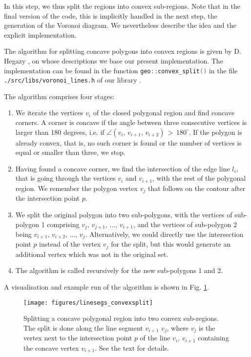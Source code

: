 In this step, we thus split the regions into convex sub-regions. 
Note that in the final version of the code, this is implicitly handled in the next step, the generation of 
the Voronoi diagram. We nevertheless describe the idea and the explicit implementation.

The algorithm for splitting concave polygons into convex regions is given by D. Hegazy \cite{Hegazy2014},
on whose descriptions we base our present implementation.
The implementation can be found in the function \lstinline[language=C++]|geo::convex_split()| in the file
\lstinline|./src/libs/voronoi_lines.h| of our library .

The algorithm \cite{Hegazy2014} comprises four stages: 
\begin{enumerate}
	\item We iterate the vertices $v_i$ of the closed polygonal region and find concave corners.
		A corner is concave if the angle between three consecutive vertices is larger than 180 degrees,
		i.e. if $\angle\left(v_{i},\, v_{i+1},\, v_{i+2}\right) \, >\,  180^{\circ}$.
		If the polygon is already convex, that is, no such corner is found or the number of vertices is 
		equal or smaller than three, we stop.
	\item Having found a concave corner, we find the intersection of the edge line $l_i$, that is going 
		through the vertices $v_{i}$ and $v_{i+1}$, with the rest of the polygonal region.
		We remember the polygon vertex $v_j$ that follows on the contour after the intersection point $p$.
	\item We split the original polygon into two sub-polygons, with the vertices of sub-polygon 1 comprising
		$v_j,\, v_{j+1},\, ...,\, v_{i+1} $, and the vertices of sub-polygon 2 being $v_{i+1},\, v_{i+2},\, ...,\, v_j$.
		Alternatively, we could directly use the intersection point $p$ instead of the vertex $v_j$ for
		the split, but this would generate an additional vertex which was not in the original set.
	\item The algorithm is called recursively for the new sub-polygons 1 and 2.
\end{enumerate}
A visualisation and example run of the algorithm is shown in Fig. \ref{fig:contour_splitting}.


\begin{figure}[htb]
	\centering
	\texttt{[image: figures/linesegs\_convexsplit]}
	\caption[Splitting of concave regions.]{
		Splitting a concave polygonal region into two convex sub-regions. The split is done 
		along the line segment $v_{i+1}$ $v_{j}$, where $v_j$ is the vertex next to the intersection
		point $p$ of the line $v_i$, $v_{i+1}$ containing the concave vertex $v_{i+1}$. See the text
		for details.
		\label{fig:contour_splitting}}
\end{figure}



